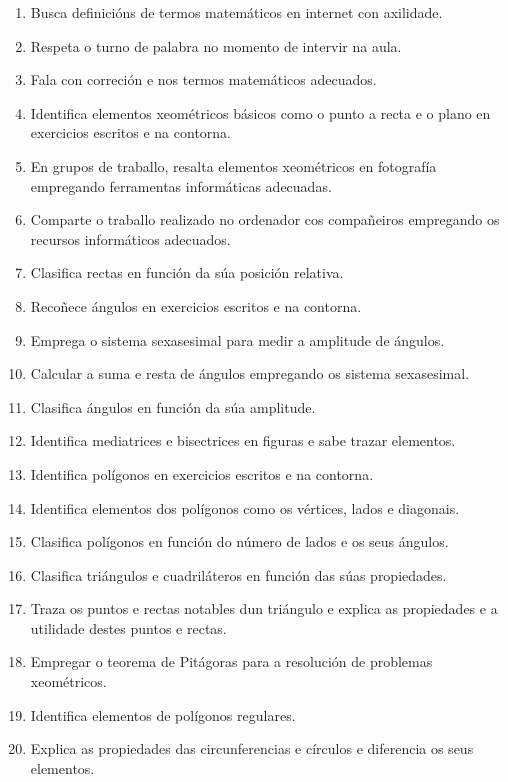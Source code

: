 \begin{enumerate}[label=\bfseries Est\arabic*, align=left, leftmargin=1.5cm]
    \item\label{est:definicions} Busca definicións de termos matemáticos en internet con axilidade.
    \item\label{est:turnopalabra} Respeta o turno de palabra no momento de intervir na aula.
    \item\label{est:falacorrecion} Fala con correción e nos termos matemáticos adecuados.
    \item\label{est:puntorecta} Identifica elementos xeométricos básicos como o punto a recta e o plano en exercicios escritos e na contorna.
    \item\label{est:resaltar} En grupos de traballo, resalta elementos xeométricos en fotografía empregando ferramentas informáticas adecuadas.
    \item\label{est:compartir} Comparte o traballo realizado no ordenador cos compañeiros empregando os recursos informáticos adecuados.
    \item\label{est:posrectas} Clasifica rectas en función da súa posición relativa.
    \item\label{est:angulos} Recoñece ángulos en exercicios escritos e na contorna.
    \item\label{est:sexasesimal} Emprega o sistema sexasesimal para medir a amplitude de ángulos.
    \item\label{est:sumarestaangulos} Calcular a suma e resta de ángulos empregando os sistema sexasesimal.
    \item\label{est:clasangulos} Clasifica ángulos en función da súa amplitude.
    \item\label{est:mediatriz} Identifica mediatrices e bisectrices en figuras e sabe trazar elementos.
    \item\label{est:poligonos} Identifica polígonos en exercicios escritos e na contorna.
    \item\label{est:elementospoligonos} Identifica elementos dos polígonos como os vértices, lados e diagonais.
    \item\label{est:claspoligolados} Clasifica polígonos en función do número de lados e os seus ángulos.
    \item\label{est:claspoligonos} Clasifica triángulos e cuadriláteros en función das súas propiedades.
    \item\label{est:puntosnotables} Traza os puntos e rectas notables dun triángulo e explica as propiedades e a utilidade destes puntos e rectas.
    \item\label{est:pitagoras} Empregar o teorema de Pitágoras para a resolución de problemas xeométricos.
    \item\label{est:elementosregulares} Identifica elementos de polígonos regulares.
    \item\label{est:circunferencia} Explica as propiedades das circunferencias e círculos e diferencia os seus elementos.
  \end{enumerate}

